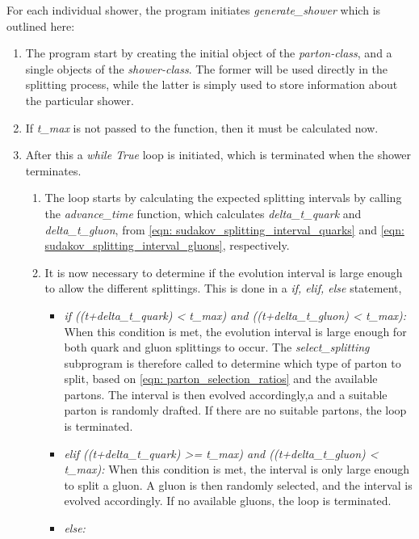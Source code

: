 \documentclass[main.tex]{subfiles}
\begin{document}
For each individual shower, the program initiates \textit{generate\_shower} which is outlined here:
\begin{enumerate}[Step 1:]
    \item The program start by creating the initial object of the \textit{parton-class}, and a single objects of the \textit{shower-class}. The former will be used directly in the splitting process, while the latter is simply used to store information about the particular shower.
    \item If \textit{t\_max} is not passed to the function, then it must be calculated now.
    \item After this a \textit{while True} loop is initiated, which is terminated when the shower terminates.
    \begin{enumerate}[{while} i)]
    \item The loop starts by calculating the expected splitting intervals by calling the \textit{advance\_time} function, which calculates \textit{delta\_t\_quark} and \textit{delta\_t\_gluon}, from \autoref{eqn: sudakov_splitting_interval_quarks} and \autoref{eqn: sudakov_splitting_interval_gluons}, respectively.
    \item It is now necessary to determine if the evolution interval is large enough to allow the different splittings. This is done in a \textit{if, elif, else} statement,
    \begin{itemize}
        \item \textit{if ((t+delta\_t\_quark) < t\_max) and ((t+delta\_t\_gluon) < t\_max):}\newline
        When this condition is met, the evolution interval is large enough for both quark and gluon splittings to occur. The \textit{select\_splitting} subprogram is therefore called to determine which type of parton to split, based on \autoref{eqn: parton_selection_ratios} and the available partons. The interval is then evolved accordingly,a and a suitable parton is randomly drafted. If there are no suitable partons, the loop is terminated.
        \item \textit{elif ((t+delta\_t\_quark) >= t\_max) and ((t+delta\_t\_gluon) < t\_max):} \newline
        When this condition is met, the interval is only large enough to split a gluon. A gluon is then randomly selected, and the interval is evolved accordingly. If no available gluons, the loop is terminated.
        \item \textit{else:} \newline

\end{itemize}
\end{enumerate}
\end{enumerate}
\end{document}
